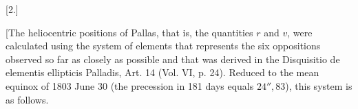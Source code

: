 \par{}\bigskip
{}
\begin{center}[2.]\end{center}
\begingroup
\newcommand{\IIILeaderPoint}{.\kern1.1pt}
\newcommand{\IIILeaderUpperLeft}{\rlap{\kern-.05em\raisebox{.5ex}{.}}\IIILeaderPoint}
\newcommand{\IIILeaderUpperRight}{\rlap{\kern.12em\raisebox{.5ex}{.}}\IIILeaderPoint}
\noindent\hspace*{\parindent}[The heliocentric positions of Pallas, that is, the quantities \(r\) and \(v\), were calculated using the system of elements that represents the six oppositions observed so far as closely as possible and that was derived in the Disquisitio de elementis ellipticis Palladis, Art. 14 (Vol. VI, p. 24). Reduced to the mean equinox of 1803 June 30 (the precession in 181 days equals \(24'',\!83\)), this system is as follows.
